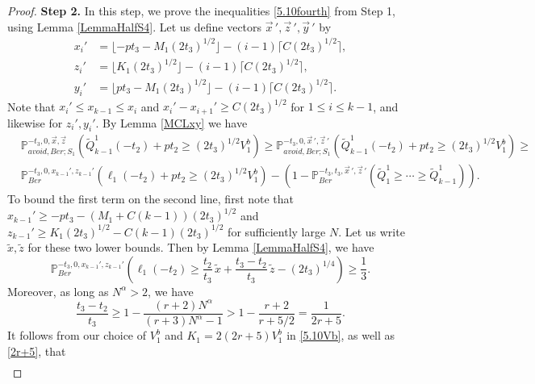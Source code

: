 \begin{proof}
	\noindent\textbf{Step 2.} In this step, we prove the inequalities \eqref{5.10fourth} from Step 1, using Lemma \ref{LemmaHalfS4}. Let us define vectors $\vec{x}\,', \vec{z}\,', \vec{y}\,'$ by
	\begin{align*}
	x_i' &= \lfloor -pt_3 - M_1(2t_3)^{1/2}\rfloor - (i-1)\lceil C(2t_3)^{1/2}\rceil,\\
	z_i' &= \lfloor K_1(2t_3)^{1/2}\rfloor - (i-1)\lceil C(2t_3)^{1/2}\rceil,\\
	y_i' &= \lfloor pt_3 - M_1(2t_3)^{1/2}\rfloor - (i-1)\lceil C(2t_3)^{1/2}\rceil.
	\end{align*}
	Note that $x_i' \leq x_{k-1} \leq x_i$ and $x_i' - x_{i+1}' \geq C(2t_3)^{1/2}$ for $1\leq i\leq k - 1$, and likewise for $z_i',y_i'$. By Lemma \ref{MCLxy} we have
	\begin{equation}\label{5.10separate}
	\begin{split}
	&\mathbb{P}^{-t_3,0,\vec{x},\vec{z}}_{avoid,Ber;S_1}\left(\tilde{Q}^1_{k-1}(-t_2) + pt_2 \geq (2t_3)^{1/2}V_1^b\right) \geq \mathbb{P}^{-t_3,0,\vec{x}\,',\vec{z}\,'}_{avoid,Ber;S_1}\left(\tilde{Q}^1_{k-1}(-t_2) + pt_2 \geq (2t_3)^{1/2}V_1^b\right) \geq \\ 
	& \mathbb{P}^{-t_3,0,x_{k-1}',z_{k-1}'}_{Ber}\left(\ell_1(-t_2) + pt_2 \geq (2t_3)^{1/2}V_1^b\right) - \left( 1 - \mathbb{P}^{-t_3,t_3,\vec{x}\,',\vec{z}\,'}_{Ber}\left(\tilde{Q}^1_1 \geq \cdots \geq \tilde{Q}_{k-1}^1\right)\right).
	\end{split}
	\end{equation} 
	To bound the first term on the second line, first note that $x_{k-1}' \geq -pt_3 - (M_1+C(k-1))(2t_3)^{1/2}$ and $z_{k-1}' \geq K_1(2t_3)^{1/2} - C(k-1)(2t_3)^{1/2}$ for sufficiently large $N$. Let us write $\tilde{x},\tilde{z}$ for these two lower bounds. Then by Lemma \ref{LemmaHalfS4}, we have
	\begin{equation}\label{5.10third1}
	\mathbb{P}^{-t_3,0,x_{k-1}',z_{k-1}'}_{Ber}\left(\ell_1(-t_2) \geq \frac{t_2}{t_3}\,\tilde{x} + \frac{t_3-t_2}{t_3}\,\tilde{z} - (2t_3)^{1/4}\right) \geq \frac{1}{3}.
	\end{equation}  
	Moreover, as long as $N^\alpha > 2$, we have 
	\begin{equation}\label{2r+5}
	\frac{t_3-t_2}{t_3} \geq 1 - \frac{(r+2)N^\alpha}{(r+3)N^\alpha - 1} > 1-\frac{r+2}{r+5/2} = \frac{1}{2r+5}.
	\end{equation}
	It follows from our choice of $V_1^b$ and $K_1 = 2(2r+5)V_1^b$ in \eqref{5.10Vb}, as well as \eqref{2r+5}, that 
	\begin{align*}

\end{align*}
\end{proof}
